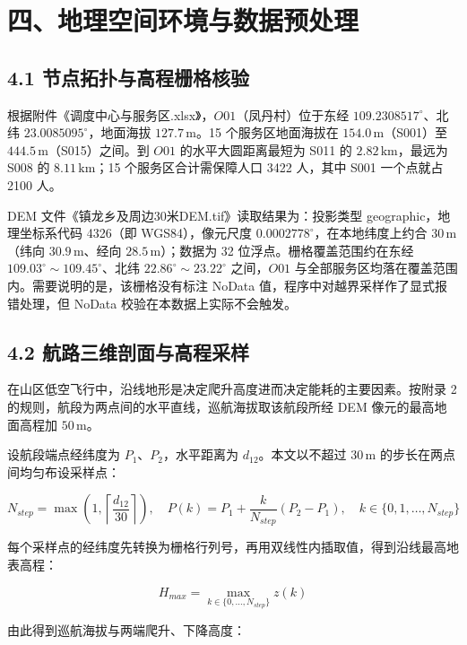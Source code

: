 \documentclass[withoutpreface,bwprint]{format}
\begin{document}
\section{四、地理空间环境与数据预处理}

\subsection{4.1 节点拓扑与高程栅格核验}
根据附件《调度中心与服务区.xlsx》，$O01$（凤丹村）位于东经 $109.2308517^\circ$、北纬 $23.0085095^\circ$，地面海拔 $127.7\,\text{m}$。15 个服务区地面海拔在 $154.0\,\text{m}$（S001）至 $444.5\,\text{m}$（S015）之间。到 $O01$ 的水平大圆距离最短为 S011 的 $2.82\,\text{km}$，最远为 S008 的 $8.11\,\text{km}$；15 个服务区合计需保障人口 3422 人，其中 S001 一个点就占 2100 人。

DEM 文件《镇龙乡及周边30米DEM.tif》读取结果为：投影类型 geographic，地理坐标系代码 4326（即 WGS84），像元尺度 $0.0002778^\circ$，在本地纬度上约合 $30\,\text{m}$（纬向 $30.9\,\text{m}$、经向 $28.5\,\text{m}$）；数据为 32 位浮点。栅格覆盖范围约在东经 $109.03^\circ\sim109.45^\circ$、北纬 $22.86^\circ\sim23.22^\circ$ 之间，$O01$ 与全部服务区均落在覆盖范围内。需要说明的是，该栅格没有标注 NoData 值，程序中对越界采样作了显式报错处理，但 NoData 校验在本数据上实际不会触发。

\subsection{4.2 航路三维剖面与高程采样}
在山区低空飞行中，沿线地形是决定爬升高度进而决定能耗的主要因素\cite{roberge2013}。按附录 2 的规则，航段为两点间的水平直线，巡航海拔取该航段所经 DEM 像元的最高地面高程加 $50\,\text{m}$。

设航段端点经纬度为 $P_1$、$P_2$，水平距离为 $d_{12}$。本文以不超过 $30\,\text{m}$ 的步长在两点间均匀布设采样点：

\begin{equation}
N_{step} = \max\left(1, \left\lceil \frac{d_{12}}{30} \right\rceil\right), \quad P(k) = P_1 + \frac{k}{N_{step}} (P_2 - P_1), \quad k \in \{0, 1, \dots, N_{step}\}
\end{equation}

每个采样点的经纬度先转换为栅格行列号，再用双线性内插取值，得到沿线最高地表高程：

\begin{equation}
H_{max} = \max_{k \in \{0, \dots, N_{step}\}} z(k)
\end{equation}

由此得到巡航海拔与两端爬升、下降高度：
\end{document}
